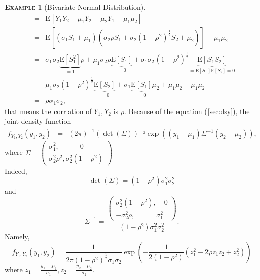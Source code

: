 \documentclass[a4paper, twoside, 11pt]{article}
\theoremstyle{definition}
\newtheorem{example}[definition]{\scshape Example}
\newcommand{\brkt}[1]{\left({#1} \right)}
\begin{document}
\begin{example}[Bivariate Normal Distribution]
\begin{eqnarray*}
						 &=& \mathrm{E}[Y_1Y_2 - \mu_1Y_2 - \mu_2Y_1 + \mu_1\mu_2]\\
						 &=& \mathrm{E}[(\sigma_1 S_1 + \mu_1)(\sigma_2\rho S_1 + \sigma_2(1-\rho^2)^{\frac{1}{2}}S_2 + \mu_2)] - \mu_1\mu_2\\
						 &=& \sigma_1\sigma_2\underbrace{\mathrm{E}[S_1^2]}_{=1}\rho + \mu_1\sigma_2\rho\underbrace{\mathrm{E}[S_1]}_{=0} +
						 \sigma_1\sigma_2(1-\rho^2)^{\frac{1}{2}}\underbrace{\mathrm{E}[S_1S_2]}_{=\mathrm{E}[S_1]\mathrm{E}[S_2]=0} \\
						 &+& \mu_1\sigma_2(1-\rho^2)^{\frac{1}{2}}\underbrace{\mathrm{E}[S_2]}_{=0} + \sigma_1\underbrace{\mathrm{E}[S_1]}_{=0}\mu_2 + \mu_1\mu_2 - \mu_1\mu_2\\
						 &=& \rho\sigma_1\sigma_2,
	\end{eqnarray*}
	that means the corrlation of $Y_1, Y_2$ is $\rho$.
	Because of the equation (\ref{sec:dsy}), the joint density function
	\begin{eqnarray*}
	  f_{Y_1, Y_2}(y_1, y_2) &=& (2\pi)^{-1} (\det(\Sigma))^{-\frac{1}{2}} \exp\brkt{(y_1 - \mu_1) \Sigma^{-1} (y_2 - \mu_2)},
	\end{eqnarray*}
	where $\Sigma =\left(
    \begin{array}{l}
	  \sigma_1^2, \hspace{3em}0 \\
	  \sigma_2^2\rho^2, \sigma_2^2(1-\rho^2)
    \end{array}
  \right)
 $\\
 Indeed, 
 $$
 	\det(\Sigma) = (1-\rho^2)\sigma_1^2\sigma_2^2
 $$ and 
 $$
 \Sigma^{-1} = \frac{
   \left(
    \begin{array}{l}
	  \sigma_2^2(1-\rho^2), \hspace{1em}0 \\
	  -\sigma_2^2\rho,\hspace{3em}\sigma_1^2
    \end{array}
  \right)}
  {\displaystyle (1-\rho^2)\sigma_1^2\sigma_2^2}.
  $$
 Namely,
 \begin{equation}
   f_{Y_1, Y_2}(y_1, y_2) = \frac{1}{2\pi(1 - \rho^2)^{\frac{1}{2}}\sigma_1\sigma_2}\exp\brkt{-\frac{1}{2(1-\rho^2)}(z_1^2 - 2\rho z_1 z_2 + z_2^2)}
   \label{sec:jdt}
 \end{equation}
 where $z_1 = \frac{y_1-\mu_1}{\sigma_1}, z_2=\frac{y_2-\mu_2}{\sigma_2}$.
\end{example}
\end{document}
